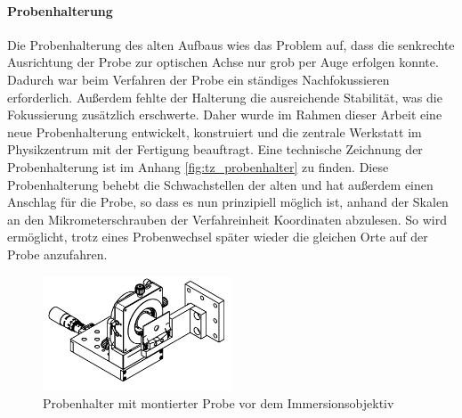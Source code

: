 \documentclass[titlepage,  ngerman]{article}
\begin{document}
	\paragraph{Probenhalterung}
	Die Probenhalterung des alten Aufbaus wies das Problem auf, dass die senkrechte Ausrichtung der Probe zur optischen Achse nur grob per Auge erfolgen konnte. Dadurch war beim Verfahren der Probe ein ständiges Nachfokussieren erforderlich. Außerdem fehlte der Halterung die ausreichende Stabilität, was die Fokussierung zusätzlich erschwerte. Daher wurde im Rahmen dieser Arbeit eine neue Probenhalterung entwickelt, konstruiert und die zentrale Werkstatt im Physikzentrum mit der Fertigung beauftragt. Eine technische Zeichnung der Probenhalterung ist im Anhang \ref{fig:tz_probenhalter} zu finden. Diese Probenhalterung behebt die Schwachstellen der alten und hat außerdem einen Anschlag für die Probe, so dass es nun prinzipiell möglich ist, anhand der Skalen an den Mikrometerschrauben der Verfahreinheit Koordinaten abzulesen. So wird ermöglicht, trotz eines Probenwechsel später wieder die gleichen Orte auf der Probe anzufahren.
	\begin{figure}[h] 
		\centering
		\includegraphics[width=0.5\textwidth]{figures/Probenhalter.pdf}
		\caption[Probenhalterung]{Probenhalter mit montierter Probe vor dem Immersionsobjektiv}
		\label{fig:probenhalter}
	\end{figure}
\end{document}

